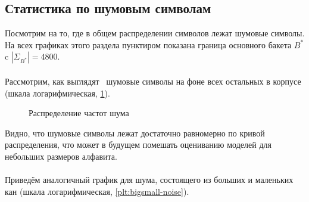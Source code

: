\subsection{ Статистика по шумовым символам }
\label{sec:noisezipfstats}

Посмотрим на то, где в общем распределении символов лежат шумовые символы. На всех графиках этого раздела пунктиром показана граница основного бакета $B^*$ c $|\Sigma_{B^*}| = 4800$.

\paragraph{ \KG } Рассмотрим, как выглядят \KG\ шумовые символы на фоне всех остальных в корпусе (шкала логарифмическая, \cref{plt:kaga-noise}).

\begin{center}

\begin{figure}[H]
	\caption{Распределение частот шума \KG}
	\label{plt:kaga-noise}
\end{figure}

\end{center}

Видно, что шумовые символы лежат достаточно равномерно по кривой распределения, что может в будущем помешать оцениванию моделей для небольших размеров алфавита.

\paragraph{ \BS } Приведём аналогичный график для шума, состоящего из больших и маленьких кан (шкала логарифмическая, \cref{plt:bigsmall-noise}).

